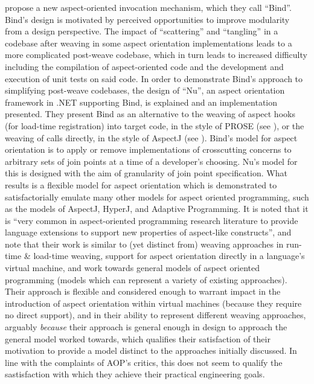 \citeauthor{rajan2006nu_towardsao_invocation} propose a new aspect-oriented
invocation mechanism, which they call
``Bind''\cite{rajan2006nu_towardsao_invocation}. Bind's design is motivated by
perceived opportunities to improve modularity from a design perspective. The
impact of ``scattering'' and ``tangling'' in a codebase after weaving in some
aspect orientation implementations leads to a more complicated post-weave
codebase, which in turn leads to increased difficulty including the compilation
of aspect-oriented code and the development and execution of unit tests on said
code. In order to demonstrate Bind's approach to simplifying post-weave
codebases, the design of ``Nu'', an aspect orientation framework in .NET
supporting Bind, is explained and an implementation presented. They present Bind
as an alternative to the weaving of aspect hooks (for load-time registration)
into target code, in the style of PROSE (see
\cite{popovici2002PROSE,popovici2003JITaspects}), or the weaving of calls
directly, in the style of AspectJ (see \cite{aspectj_intro}). Bind's model for
aspect orientation is to apply or remove implementations of crosscutting
concerns to arbitrary sets of join points at a time of a developer's choosing.
Nu's model for this is designed with the aim of granularity of join point
specification. What results is a flexible model for aspect orientation which is
demonstrated to satisfactorially emulate many other models for aspect oriented
programming, such as the models of AspectJ, HyperJ, and Adaptive Programming. It
is noted that it is ``very common in aspect-oriented programming research
literature to provide language extensions to support new properties of
aspect-like constructs'', and note that their work is similar to (yet distinct
from) weaving approaches in run-time \& load-time weaving, support for aspect
orientation directly in a language's virtual machine, and work towards general
models of aspect oriented programming (models which can represent a variety of
existing approaches). Their approach is flexible and considered enough to
warrant impact in the introduction of aspect orientation within virtual machines
(because they require no direct support), and in their ability to represent
different weaving approaches, arguably \emph{because} their approach is general
enough in design to approach the general model worked towards, which qualifies
their satisfaction of their motivation to provide a model distinct to the
approaches initially discussed. In line with the complaints of AOP's critics,
this does not seem to qualify the sastisfaction with which they achieve their
practical engineering goals.

